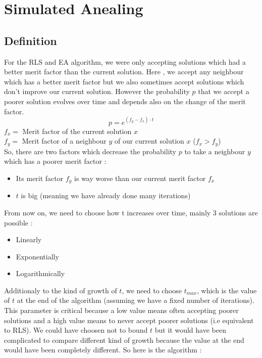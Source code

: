 \documentclass[a4paper,11pt,openany]{article}
\begin{document}
\section{Simulated Anealing}
\subsection{Definition}
\noindent
For the RLS and EA algorithm, we were only accepting solutions which had a better merit factor than the current solution. Here \cite{sa}, we accept any neighbour which has a better merit factor but we also sometimes accept solutions which don't improve our current solution. However the probability $p$ that we accept a poorer solution evolves over time and depends also on the change of the merit factor.
\begin{equation}
p=e^{(f_y-f_x)\cdot t}
\end{equation}
$f_x=$ Merit factor of the current solution $x$\\
$f_y=$ Merit factor of a neighbour $y$ of our current solution $x$ ($f_x>f_y$)\\
So, there are two factors which decrease the probability $p$ to take a neighbour $y$ which has a poorer merit factor :
\begin{itemize}
\item Its merit factor $f_y$ is way worse than our current merit factor $f_x$
\item $t$ is big (meaning we have already done many iterations)
\end{itemize} 
From now on, we need to choose how t increases over time, mainly 3 solutions are possible :
\begin{itemize}
\item Linearly
\item Exponentially
\item Logarithmically
\end{itemize}
Additionaly to the kind of growth of $t$, we need to choose $t_{max}$, which is the value of $t$ at the end of the algorithm (assuming we have a fixed number of iterations). This parameter is critical because a low value means often accepting poorer solutions and a high value means to never accept poorer solutions (i.e equivalent to RLS). We could have choosen not to bound $t$ but it would have been complicated to compare different kind of growth because the value at the end would have been completely different. So here is the algorithm :
\end{document}

